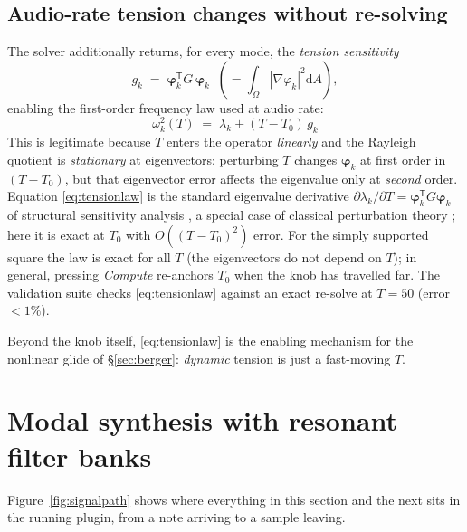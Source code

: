 \documentclass[11pt,a4paper]{article}
\newcommand{\dd}{\mathrm{d}}
\begin{document}
\subsection{Audio-rate tension changes without re-solving}
\label{sec:tension}

The solver additionally returns, for every mode, the \emph{tension
sensitivity}
%
\begin{equation}
  g_k \;=\; \bm\varphi_k^{\mathsf T} G\, \bm\varphi_k
  \;\;\left(=\int_\Omega |\nabla \varphi_k|^2 \dd A \right) ,
\end{equation}
%
enabling the first-order frequency law used at audio rate:
%
\begin{equation}
  \boxed{\;\omega_k^2(T) \;=\; \lambda_k + (T - T_0)\, g_k\;}
  \label{eq:tensionlaw}
\end{equation}
%
This is legitimate because $T$ enters the operator \emph{linearly} and the
Rayleigh quotient is \emph{stationary} at eigenvectors: perturbing $T$
changes $\bm\varphi_k$ at first order in $(T-T_0)$, but that eigenvector
error affects the eigenvalue only at \emph{second} order. Equation
\eqref{eq:tensionlaw} is the standard eigenvalue derivative
$\partial\lambda_k/\partial T = \bm\varphi_k^{\mathsf T} G \bm\varphi_k$ of
structural sensitivity analysis \cite{fox-kapoor}, a special case of
classical perturbation theory \cite{courant,kato}; here it is exact at
$T_0$ with $O\!\left((T-T_0)^2\right)$ error. For the simply supported
square the law is exact for all $T$ (the eigenvectors do not depend on
$T$); in general, pressing \emph{Compute} re-anchors $T_0$ when the knob
has travelled far. The validation suite checks \eqref{eq:tensionlaw}
against an exact re-solve at $T=50$ (error $<1\%$).

Beyond the knob itself, \eqref{eq:tensionlaw} is the enabling mechanism for
the nonlinear glide of \S\ref{sec:berger}: \emph{dynamic} tension is just a
fast-moving $T$.

\section{Modal synthesis with resonant filter banks}
\label{sec:filterbank}

Figure~\ref{fig:signalpath} shows where everything in this section and
the next sits in the running plugin, from a note arriving to a sample
leaving.
\end{document}
